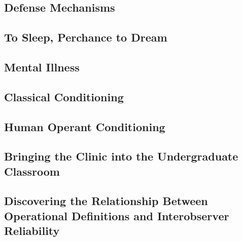 \begin{refsection}
\begin{appendices}
\label{app: operantconditioning}


\subsection{Defense Mechanisms}
\label{defensemechanisms}

\label{app: defensemechanism}


\subsection{To Sleep, Perchance to Dream}
\label{tosleepperchancetodream}

\label{app: tosleep}


\subsection{Mental Illness}
\label{mentalillness}

\label{app: mentalillness}


\subsection{Classical Conditioning}
\label{classicalconditioning}

\label{app: classicalconditioning}


\subsection{Human Operant Conditioning}
\label{humanoperantconditioning}

\label{app: humanoperantconditioning}


\subsection{Bringing the Clinic into the Undergraduate Classroom}
\label{bringingtheclinicintotheundergraduateclassroom}

\label{app: theclinic}


\subsection{Discovering the Relationship Between Operational Definitions and Interobserver Reliability}
\label{discoveringtherelationshipbetweenoperationaldefinitionsandinterobserverreliability}


\end{appendices}
\end{refsection}
